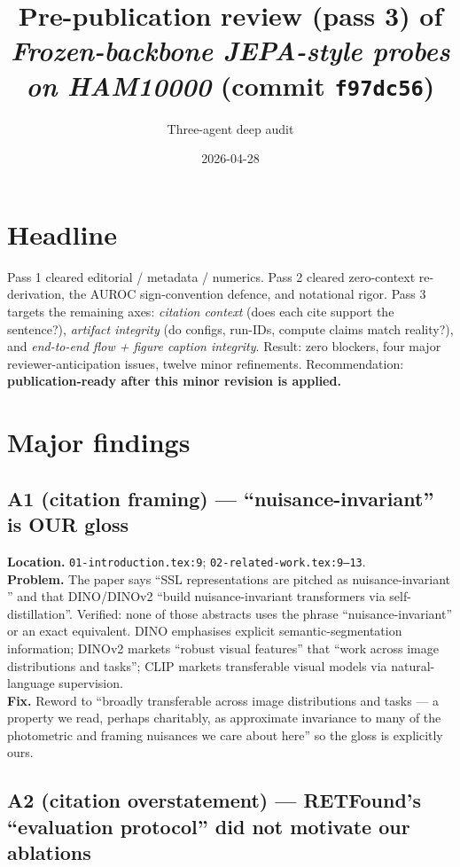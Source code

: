 \documentclass[11pt,a4paper]{article}
\title{Pre-publication review (pass 3) of \emph{Frozen-backbone JEPA-style
       probes on HAM10000} (commit \texttt{f97dc56})}
\author{Three-agent deep audit}
\date{2026-04-28}
\begin{document}
\maketitle

\section*{Headline}

Pass 1 cleared editorial / metadata / numerics. Pass 2 cleared zero-context
re-derivation, the AUROC sign-convention defence, and notational rigor. Pass
3 targets the remaining axes: \emph{citation context} (does each cite
support the sentence?), \emph{artifact integrity} (do configs, run-IDs,
compute claims match reality?), and \emph{end-to-end flow + figure caption
integrity}. Result: zero blockers, four major reviewer-anticipation issues,
twelve minor refinements. Recommendation: \textbf{publication-ready after
this minor revision is applied.}

\section{Major findings}

\subsection*{A1 (citation framing) --- ``nuisance-invariant'' is OUR gloss}

\textbf{Location.} \texttt{01-introduction.tex:9}; \texttt{02-related-work.tex:9--13}.\\
\textbf{Problem.} The paper says ``SSL representations are pitched as
nuisance-invariant \citep{caron2021dino, oquab2024dinov2, radford2021clip}''
and that DINO/DINOv2 ``build nuisance-invariant transformers via
self-distillation''. Verified: none of those abstracts uses the phrase
``nuisance-invariant'' or an exact equivalent. DINO emphasises explicit
semantic-segmentation information; DINOv2 markets ``robust visual features''
that ``work across image distributions and tasks''; CLIP markets transferable
visual models via natural-language supervision.\\
\textbf{Fix.} Reword to ``broadly transferable across image distributions
and tasks --- a property we read, perhaps charitably, as approximate
invariance to many of the photometric and framing nuisances we care about
here'' so the gloss is explicitly ours.

\subsection*{A2 (citation overstatement) --- RETFound's ``evaluation
            protocol'' did not motivate our ablations}
\end{document}
